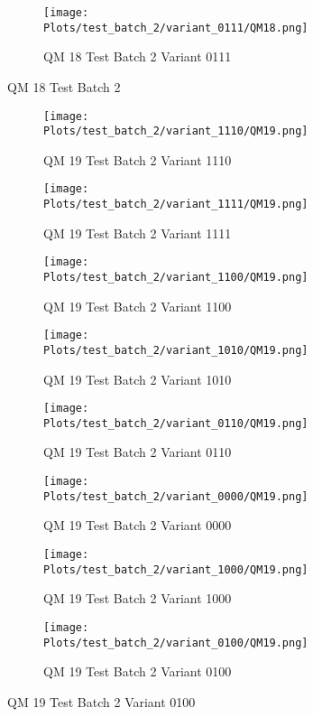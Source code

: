 \documentclass{DissertateFigs}
\begin{document}
\begin{figure}[t!]
\medskip

    \begin{subfigure}{0.47\textwidth}
    \texttt{[image: Plots/test\_batch\_2/variant\_0111/QM18.png]}
    \caption{QM 18 Test Batch 2 Variant 0111}
    \end{subfigure}
\caption{QM 18 Test Batch 2}
    \end{figure}
\clearpage
\begin{figure}[t!]
    \begin{subfigure}{0.47\textwidth}
    \texttt{[image: Plots/test\_batch\_2/variant\_1110/QM19.png]}
    \caption{QM 19 Test Batch 2 Variant 1110}
    \end{subfigure}
    \begin{subfigure}{0.47\textwidth}
    \texttt{[image: Plots/test\_batch\_2/variant\_1111/QM19.png]}
    \caption{QM 19 Test Batch 2 Variant 1111}
    \end{subfigure}

\medskip

    \begin{subfigure}{0.47\textwidth}
    \texttt{[image: Plots/test\_batch\_2/variant\_1100/QM19.png]}
    \caption{QM 19 Test Batch 2 Variant 1100}
    \end{subfigure}
    \begin{subfigure}{0.47\textwidth}
    \texttt{[image: Plots/test\_batch\_2/variant\_1010/QM19.png]}
    \caption{QM 19 Test Batch 2 Variant 1010}
    \end{subfigure}

\medskip

    \begin{subfigure}{0.47\textwidth}
    \texttt{[image: Plots/test\_batch\_2/variant\_0110/QM19.png]}
    \caption{QM 19 Test Batch 2 Variant 0110}
    \end{subfigure}
    \begin{subfigure}{0.47\textwidth}
    \texttt{[image: Plots/test\_batch\_2/variant\_0000/QM19.png]}
    \caption{QM 19 Test Batch 2 Variant 0000}
    \end{subfigure}

\medskip

    \begin{subfigure}{0.47\textwidth}
    \texttt{[image: Plots/test\_batch\_2/variant\_1000/QM19.png]}
    \caption{QM 19 Test Batch 2 Variant 1000}
    \end{subfigure}
    \begin{subfigure}{0.47\textwidth}
    \texttt{[image: Plots/test\_batch\_2/variant\_0100/QM19.png]}
    \caption{QM 19 Test Batch 2 Variant 0100}
    \end{subfigure}


\end{figure}
\end{document}

